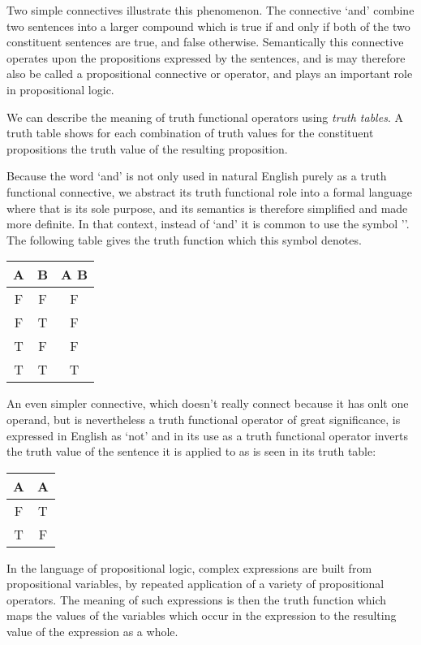 \documentclass[10pt,titlepage]{article}
\begin{document}
Two simple connectives illustrate this phenomenon.
The connective `and' combine two sentences into a larger compound which is true if and only if both of the two constituent sentences are true, and false otherwise.
Semantically this connective operates upon the propositions expressed by the sentences, and is may therefore also be called a propositional connective or operator, and plays an important role in propositional logic.

We can describe the meaning of truth functional operators using \emph{truth tables}.
A truth table shows for each combination of truth values for the constituent propositions the truth value of the resulting proposition.

Because the word `and' is not only used in natural English purely as a truth functional connective, we abstract its truth functional role into a formal language where that is its sole purpose, and its semantics is therefore simplified and made more definite.
In that context, instead of `and' it is common to use the symbol '\land'.
The following table gives the truth function which this symbol denotes.

\begin{center}
  \begin{tabular}{c|c|c}
 A & B & A \land{} B\\
 \hline
 F & F & F\\
 F & T & F\\
 T & F & F\\
 T & T & T\\
 \end{tabular}
\end{center}

An even simpler connective, which doesn't really connect because it has onlt one operand, but is nevertheless a truth functional operator of great significance, is expressed in English as `not' and in its use as a truth functional operator inverts the truth value of the sentence it is applied to as is seen in its truth table:


\begin{center}
  \begin{tabular}{c|c}
 A &\lnot{} A\\
 \hline
 F & T\\
 T & F\\
 \end{tabular}
\end{center}


In the language of propositional logic, complex expressions are built from propositional variables, by repeated application of a variety of propositional operators.
The meaning of such expressions is then the truth function which maps the values of the variables which occur in the expression to the resulting value of the expression as a whole.
\end{document}
